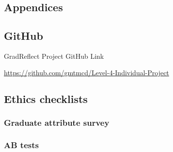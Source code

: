 \documentclass{l4proj}
\begin{document}
\begin{appendices}

\chapter{Appendices}







\section{GitHub}\label{AppendixGitHub}

GradReflect Project GitHub Link

\url{https://github.com/gmtmcd/Level-4-Individual-Project}

\section{Ethics checklists}

\subsection{Graduate attribute survey}



\subsection{AB tests}


\end{appendices}
\end{document}
